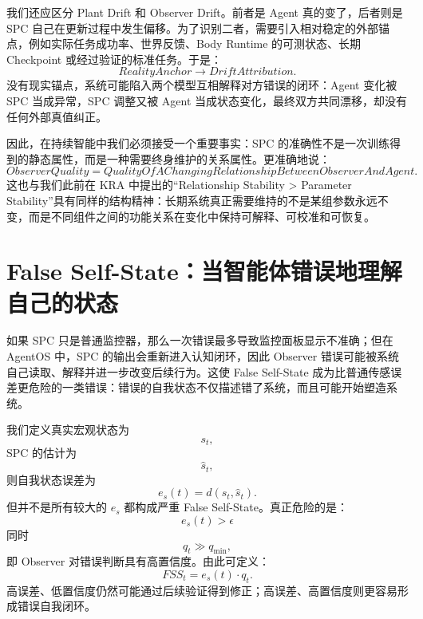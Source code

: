 我们还应区分 Plant Drift 和 Observer Drift。前者是 Agent 真的变了，后者则是 SPC 自己在更新过程中发生偏移。为了识别二者，需要引入相对稳定的外部锚点，例如实际任务成功率、世界反馈、Body Runtime 的可测状态、长期 Checkpoint 或经过验证的标准任务。于是：
\begin{equation}
RealityAnchor
\rightarrow
DriftAttribution.
\end{equation}
没有现实锚点，系统可能陷入两个模型互相解释对方错误的闭环：Agent 变化被 SPC 当成异常，SPC 调整又被 Agent 当成状态变化，最终双方共同漂移，却没有任何外部真值纠正。

因此，在持续智能中我们必须接受一个重要事实：SPC 的准确性不是一次训练得到的静态属性，而是一种需要终身维护的关系属性。更准确地说：
\begin{equation}
\boxed{
ObserverQuality
=
QualityOfAChangingRelationship
BetweenObserverAndAgent.
}
\end{equation}
这也与我们此前在 KRA 中提出的“Relationship Stability > Parameter Stability”具有同样的结构精神：长期系统真正需要维持的不是某组参数永远不变，而是不同组件之间的功能关系在变化中保持可解释、可校准和可恢复。

\section{False Self-State：当智能体错误地理解自己的状态}
\label{sec:spc-false-self-state}

如果 SPC 只是普通监控器，那么一次错误最多导致监控面板显示不准确；但在 AgentOS 中，SPC 的输出会重新进入认知闭环，因此 Observer 错误可能被系统自己读取、解释并进一步改变后续行为。这使 False Self-State 成为比普通传感误差更危险的一类错误：错误的自我状态不仅描述错了系统，而且可能开始塑造系统。

我们定义真实宏观状态为
\begin{equation}
s_t,
\end{equation}
SPC 的估计为
\begin{equation}
\hat s_t,
\end{equation}
则自我状态误差为
\begin{equation}
e_s(t)
=
d(s_t,\hat s_t).
\end{equation}
但并不是所有较大的 $e_s$ 都构成严重 False Self-State。真正危险的是：
\begin{equation}
e_s(t)>\epsilon
\end{equation}
同时
\begin{equation}
q_t\gg q_{\min},
\end{equation}
即 Observer 对错误判断具有高置信度。由此可定义：
\begin{equation}
FSS_t
=
e_s(t)\cdot q_t.
\end{equation}
高误差、低置信度仍然可能通过后续验证得到修正；高误差、高置信度则更容易形成错误自我闭环。

